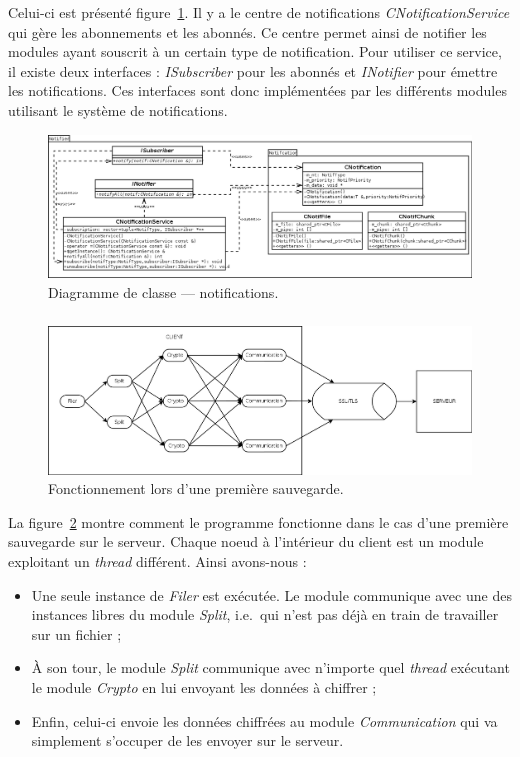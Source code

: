 \documentclass[a4paper,10pt, twoside]{report}
\begin{document}
\begin{spacing}{1.2}
Celui-ci est présenté figure~\ref{classDiagramNotif}. Il y a le centre de
notifications \textit{CNotificationService} qui gère les abonnements et les
abonnés. Ce centre permet ainsi de notifier les modules ayant souscrit à un
certain type de notification. Pour utiliser ce service, il existe deux
interfaces : \textit{ISubscriber} pour les abonnés et \textit{INotifier} pour
émettre les notifications. Ces interfaces sont donc implémentées par les
différents modules utilisant le système de notifications.

\begin{figure}[h!]
  \hspace{-4.5em}
  \includegraphics[width=19cm]{softwareDesign/classDiagramNotif.png}
  \caption{\label{classDiagramNotif} Diagramme de classe --- notifications.}
\end{figure}

\subparagraph{}
\begin{figure}[h!]
  \hspace{-1.5em}
  \includegraphics[width=17cm]{softwareDesign/moduleInteraction.png}
  \caption{\label{interactModule} Fonctionnement lors d'une première
  sauvegarde.}
\end{figure}

La figure~\ref{interactModule} montre comment le programme fonctionne dans le
cas d'une première sauvegarde sur le serveur. Chaque noeud à l'intérieur du
client est un module exploitant un \textit{thread} différent. Ainsi
avons-nous :

\begin{itemize}
 \item Une seule instance de \textit{Filer} est exécutée. Le module
 communique avec une des instances libres du module \textit{Split}, i.e.~qui
 n'est pas déjà en train de travailler sur un fichier ;
 \item À son tour, le module \textit{Split} communique avec n'importe quel
 \textit{thread} exécutant le module \textit{Crypto} en lui envoyant les
 données à chiffrer ;
 \item Enfin, celui-ci envoie les données chiffrées au module
 \textit{Communication} qui va simplement s'occuper de les envoyer sur le
 serveur.
\end{itemize}


\end{spacing}
\end{document}
